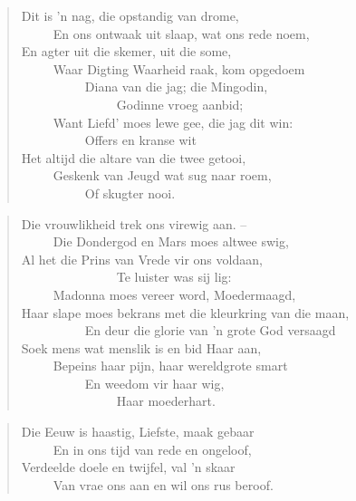 \begin{verse}
Dit is ’n nag, die opstandig van drome, \\ 
\ \ \ \ \ En ons ontwaak uit slaap, wat ons rede noem, \\ 
En agter uit die skemer, uit die some, \\ 
\ \ \ \ \ Waar Digting Waarheid raak, kom opgedoem \\ 
\ \ \ \ \ \ \ \ \ \ Diana van die jag; die Mingodin, \\ 
\ \ \ \ \ \ \ \ \ \ \ \ \ \ \ Godinne vroeg aanbid; \\ 
\ \ \ \ \ Want Liefd’ moes lewe gee, die jag dit win: \\ 
\ \ \ \ \ \ \ \ \ \ Offers en kranse wit \\ 
Het altijd die altare van die twee getooi, \\ 
\ \ \ \ \ Geskenk van Jeugd wat sug naar roem, \\ 
\ \ \ \ \ \ \ \ \ \ Of skugter nooi.
\end{verse}

\begin{verse}
Die vrouwlikheid trek ons virewig aan. -- \\ 
\ \ \ \ \ Die Dondergod en Mars moes altwee swig, \\ 
Al het die Prins van Vrede vir ons voldaan, \\ 
\ \ \ \ \ \ \ \ \ \ \ \ \ \ \ Te luister was sij lig: \\ 
\ \ \ \ \ Madonna moes vereer word, Moedermaagd, \\ 
Haar slape moes bekrans met die kleurkring van die maan, \\ 
\ \ \ \ \ \ \ \ \ \ En deur die glorie van ’n grote God versaagd \\ 
Soek mens wat menslik is en bid Haar aan, \\ 
\ \ \ \ \ Bepeins haar pijn, haar wereldgrote smart \\ 
\ \ \ \ \ \ \ \ \ \ En weedom vir haar wig, \\ 
\ \ \ \ \ \ \ \ \ \ \ \ \ \ \ Haar moederhart.
\end{verse}

\begin{verse}
Die Eeuw is haastig, Liefste, maak gebaar \\ 
\ \ \ \ \ En in ons tijd van rede en ongeloof, \\ 
Verdeelde doele en twijfel, val ’n skaar \\ 
\ \ \ \ \ Van vrae ons aan en wil ons rus beroof. \\ 
\end{verse}

